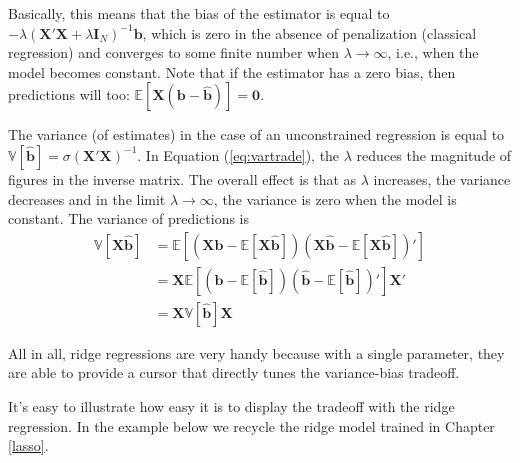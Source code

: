 \documentclass[]{krantz}
\theoremstyle{definition}
\theoremstyle{definition}
\theoremstyle{definition}
\theoremstyle{remark}
\begin{document}
Basically, this means that the bias of the estimator is equal to
\(-\lambda(\textbf{X}'\textbf{X}+\lambda \textbf{I}_N)^{-1} \textbf{b}\),
which is zero in the absence of penalization (classical regression) and
converges to some finite number when \(\lambda \rightarrow \infty\),
i.e., when the model becomes constant. Note that if the estimator has a
zero bias, then predictions will too:
\(\mathbb{E}[\textbf{X}(\textbf{b}-\hat{\textbf{b}})]=\textbf{0}\).

The variance (of estimates) in the case of an unconstrained regression
is equal to
\(\mathbb{V}[\hat{\textbf{b}}]=\sigma (\textbf{X}'\textbf{X})^{-1}\). In
Equation (\eqref{eq:vartrade}), the \(\lambda\) reduces the magnitude of
figures in the inverse matrix. The overall effect is that as \(\lambda\)
increases, the variance decreases and in the limit
\(\lambda \rightarrow \infty\), the variance is zero when the model is
constant. The variance of predictions is \begin{align*}
\mathbb{V}[\textbf{X}\hat{\textbf{b}}]&=\mathbb{E}[(\textbf{X}\hat{\textbf{b}}-\mathbb{E}[\textbf{X}\hat{\textbf{b}}])(\textbf{X}\hat{\textbf{b}}-\mathbb{E}[\textbf{X}\hat{\textbf{b}}])'] \\
&= \textbf{X}\mathbb{E}[(\hat{\textbf{b}}-\mathbb{E}[\hat{\textbf{b}}])(\hat{\textbf{b}}-\mathbb{E}[\hat{\textbf{b}}])']\textbf{X}' \\
&= \textbf{X}\mathbb{V}[\hat{\textbf{b}}]\textbf{X}
\end{align*}

All in all, ridge regressions are very handy because with a single
parameter, they are able to provide a cursor that directly tunes the
variance-bias tradeoff.

It's easy to illustrate how easy it is to display the tradeoff with the
ridge regression. In the example below we recycle the ridge model
trained in Chapter \ref{lasso}.

\footnotesize
\end{document}
